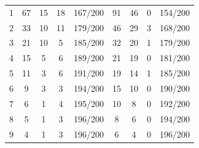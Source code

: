 \documentclass{article}
\begin{document}
\begin{table}[h]
{\begin{tabular}{@{}ccccccccc@{}}
1 & 67 & 15 & 18 & 167/200 & 91 & 46 & 0 & 154/200 \\
2 & 33 & 10 & 11 & 179/200 & 46 & 29 & 3 & 168/200 \\
3 & 21 & 10 & 5 & 185/200 & 32 & 20 & 1 & 179/200 \\
4 & 15 & 5 & 6 & 189/200 & 21 & 19 & 0 & 181/200 \\
5 & 11 & 3 & 6 & 191/200 & 19 & 14 & 1 & 185/200 \\
6 & 9 & 3 & 3 & 194/200 & 15 & 10 & 0 & 190/200 \\
7 & 6 & 1 & 4 & 195/200 & 10 & 8 & 0 & 192/200 \\
8 & 5 & 1 & 3 & 196/200 & 8 & 6 & 0 & 194/200 \\
9 & 4 & 1 & 3 & 196/200 & 6 & 4 & 0 & 196/200 \\ \bottomrule
\end{tabular}
}
\end{table}
\end{document}
